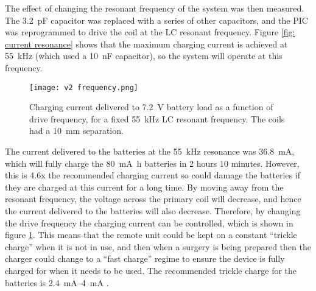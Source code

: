 The effect of changing the resonant frequency of the system was then measured. The \SI{3.2}{\pico\farad} capacitor was replaced with a series of other capacitors, and the PIC was reprogrammed to drive the coil at the LC resonant frequency. Figure \ref{fig: current resonance} shows that the maximum charging current is achieved at \SI{55}{\kilo\hertz} (which used a \SI{10}{\nano\farad} capacitor), so the system will operate at this frequency.\\ 


\begin{figure}[htb]
	\centering
	\texttt{[image: v2 frequency.png]}
	\caption{Charging current delivered to \SI{7.2}{\volt} battery load as a function of drive frequency, for a fixed \SI{55}{\kilo\hertz} LC resonant frequency. The coils had a \SI{10}{\milli\metre} separation.}
	\label{fig: current frequency}
\end{figure}

The current delivered to the batteries at the \SI{55}{\kilo\hertz} resonance was \SI{36.8}{\milli\ampere}, which will fully charge the \SI{80}{\milli\ampere\hour} batteries in 2 hours 10 minutes. However, this is 4.6x the recommended charging current so could damage the batteries if they are charged at this current for a long time. By moving away from the resonant frequency, the voltage across the primary coil will decrease, and hence the current delivered to the batteries will also decrease. Therefore, by changing the drive frequency the charging current can be controlled, which is shown in figure \ref{fig: current frequency}. This means that the remote unit could be kept on a constant ``trickle charge'' when it is not in use, and then when a surgery is being prepared then the charger could change to a ``fast charge'' regime to ensure the device is fully charged for when it needs to be used. The recommended trickle charge for the batteries is \SIrange{2.4}{4}{\milli\ampere} \cite{rs_pro_batteries}.\\

